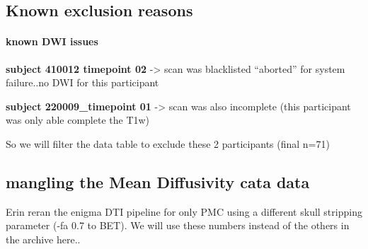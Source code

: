 \documentclass[]{article}
\newenvironment{Shaded}{\begin{snugshade}}{\end{snugshade}}
\newcommand{\KeywordTok}[1]{\textcolor[rgb]{0.13,0.29,0.53}{\textbf{#1}}}
\newcommand{\StringTok}[1]{\textcolor[rgb]{0.31,0.60,0.02}{#1}}
\newcommand{\OperatorTok}[1]{\textcolor[rgb]{0.81,0.36,0.00}{\textbf{#1}}}
\newcommand{\NormalTok}[1]{#1}
\let\oldparagraph\paragraph
\renewcommand{\paragraph}[1]{\oldparagraph{#1}\mbox{}}
\theoremstyle{definition}
\theoremstyle{definition}
\theoremstyle{definition}
\theoremstyle{remark}
\begin{document}
\subsection{Known exclusion reasons}\label{known-exclusion-reasons}

\paragraph{known DWI issues}\label{known-dwi-issues}

\textbf{subject 410012 timepoint 02} -\textgreater{} scan was
blacklisted ``aborted'' for system failure..no DWI for this participant

\textbf{subject 220009\_timepoint 01} -\textgreater{} scan was also
incomplete (this participant was only able complete the T1w)

So we will filter the data table to exclude these 2 participants (final
n=71)

\begin{Shaded}
\end{Shaded}

\subsection{mangling the Mean Diffusivity cata
data}\label{mangling-the-mean-diffusivity-cata-data}

Erin reran the enigma DTI pipeline for only PMC using a different skull
stripping parameter (-fa 0.7 to BET). We will use these numbers instead
of the others in the archive here..
\end{document}
